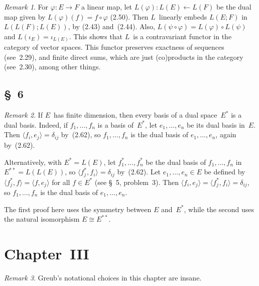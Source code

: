 \documentclass[letterpaper,12pt]{article}
\newcommand{\from}{\leftarrow}
\newcommand{\iso}{\cong}
\newcommand{\after}{\circ}
\newcommand{\sprod}[2]{\langle#1,#2\rangle}
\theoremstyle{definition}
\theoremstyle{remark}
\newtheorem*{rmk}{Remark}
\begin{document}
\begin{rmk}
For \(\varphi:E\to F\) a linear map, let \(L(\varphi):L(E)\from L(F)\) be the dual map given by \(L(\varphi)(f)=f\after\varphi\) (2.50). Then \(L\)~linearly embeds \(L(E;F)\) in \(L(L(F);L(E))\), by (2.43) and~(2.44). Also, \(L(\psi\after\varphi)=L(\varphi)\after L(\psi)\) and \(L(\iota_{E})=\iota_{L(E)}\). This shows that \(L\)~is a contravariant functor in the category of vector spaces. This functor preserves exactness of sequences (see~2.29), and finite direct sums, which are just (co)products in the category (see~2.30), among other things.
\end{rmk}

\subsection*{\S~6}
\begin{rmk}
If \(E\)~has finite dimension, then every basis of a dual space~\(E^*\) is a dual basis. Indeed, if \(f_1,\ldots,f_n\) is a basis of~\(E^*\), let \(e_1,\ldots,e_n\) be its dual basis in~\(E\). Then \(\sprod{f_i}{e_j}=\delta_{ij}\) by~(2.62), so \(f_1,\ldots,f_n\) is the dual basis of \(e_1,\ldots,e_n\), again by~(2.62).

Alternatively, with \(E^*=L(E)\), let \(f_1^*,\ldots,f_n^*\) be the dual basis of \(f_1,\ldots,f_n\) in \(E^{**}=L(L(E))\), so \(\sprod{f_j^*}{f_i}=\delta_{ij}\) by~(2.62). Let \(e_1,\ldots,e_n\in E\) be defined by \(\sprod{f_j^*}{f}=\sprod{f}{e_j}\) for all \(f\in E^*\) (see \S~5, problem~3). Then \(\sprod{f_i}{e_j}=\sprod{f_j^*}{f_i}=\delta_{ij}\), so \(f_1,\ldots,f_n\) is the dual basis of \(e_1,\ldots,e_n\).

The first proof here uses the symmetry between \(E\) and~\(E^*\), while the second uses the natural isomorphism \(E\iso E^{**}\).
\end{rmk}

\section*{Chapter~III}
\begin{rmk}
Greub's notational choices in this chapter are insane.
\end{rmk}
\end{document}
